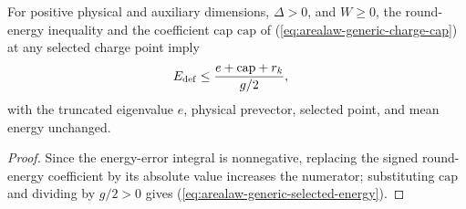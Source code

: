 \begin{lemma}
    \label{thm:arealaw-generic-selected-energy}
    \leanok
    For positive physical and auxiliary dimensions, $\Delta>0$, and $W\geq0$,
    the round-energy inequality and the coefficient cap $\mathrm{cap}$ of
    (\ref{eq:arealaw-generic-charge-cap}) at any selected charge point imply
    \begin{align}
        E_{\rm def} & \leq \frac{e+\mathrm{cap}+r_k}{g/2},
        \label{eq:arealaw-generic-selected-energy}
    \end{align}
    with the truncated eigenvalue $e$, physical prevector, selected point, and mean energy unchanged.
\end{lemma}
\begin{proof}
    \leanok
    Since the energy-error integral is nonnegative, replacing the signed round-energy
    coefficient by its absolute value increases the numerator; substituting $\mathrm{cap}$
    and dividing by $g/2>0$ gives (\ref{eq:arealaw-generic-selected-energy}).
\end{proof}


